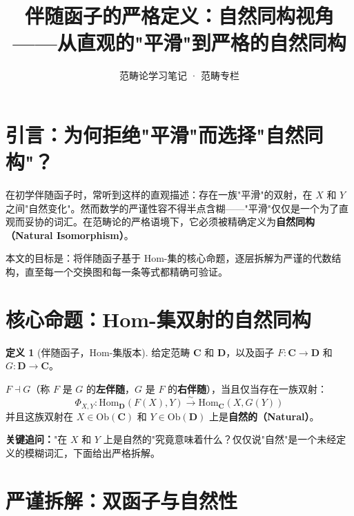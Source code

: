 \documentclass[12pt,a4paper]{ctexart}
\title{\textbf{伴随函子的严格定义：自然同构视角}\\[0.3em]
\large ——从直观的"平滑"到严格的自然同构}
\author{范畴论学习笔记 · 范畴专栏}
\date{}
\theoremstyle{definition}
\newtheorem{definition}{定义}[section]
\newcommand{\cat}[1]{\mathbf{#1}}
\newcommand{\ob}[1]{\mathrm{Ob}(#1)}
\newcommand{\Hom}{\mathrm{Hom}}
\begin{document}
\maketitle

\tableofcontents
\newpage

\section{引言：为何拒绝"平滑"而选择"自然同构"？}

在初学伴随函子时，常听到这样的直观描述：存在一族"平滑"的双射，在 $X$ 和 $Y$ 之间"自然变化"。然而数学的严谨性容不得半点含糊——"平滑"仅仅是一个为了直观而妥协的词汇。在范畴论的严格语境下，它必须被精确定义为\textbf{自然同构（Natural Isomorphism）}。

本文的目标是：将伴随函子基于 Hom-集的核心命题，逐层拆解为严谨的代数结构，直至每一个交换图和每一条等式都精确可验证。

\newpage

\section{核心命题：Hom-集双射的自然同构}

\begin{definition}[伴随函子，Hom-集版本]\label{def:adjunction-hom}
给定范畴 $\cat{C}$ 和 $\cat{D}$，以及函子 $F: \cat{C} \to \cat{D}$ 和 $G: \cat{D} \to \cat{C}$。

$F \dashv G$（称 $F$ 是 $G$ 的\textbf{左伴随}，$G$ 是 $F$ 的\textbf{右伴随}），当且仅当存在一族双射：
\begin{equation}\label{eq:phi-family}
\Phi_{X,Y}: \Hom_{\cat{D}}(F(X), Y) \xrightarrow{\; \sim \;} \Hom_{\cat{C}}(X, G(Y))
\end{equation}
并且这族双射在 $X \in \ob{\cat{C}}$ 和 $Y \in \ob{\cat{D}}$ 上是\textbf{自然的（Natural）}。
\end{definition}

\textbf{关键追问：}"在 $X$ 和 $Y$ 上是自然的"究竟意味着什么？仅仅说"自然"是一个未经定义的模糊词汇，下面给出严格拆解。

\newpage

\section{严谨拆解：双函子与自然性}
\end{document}
